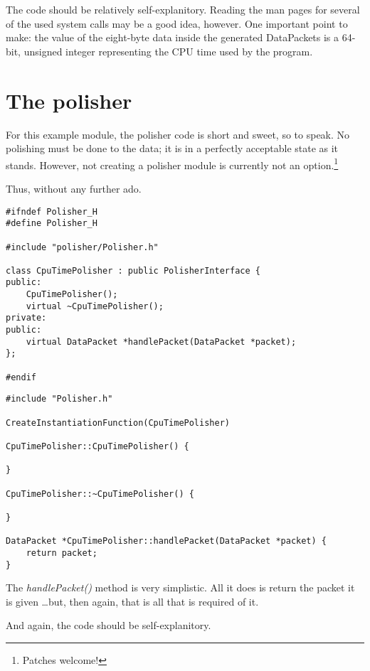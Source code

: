 The code should be relatively self-explanitory. Reading the man pages for several of the used system calls may be a
good idea, however. One important point to make: the value of the eight-byte data inside the generated DataPackets is a
64-bit, unsigned integer representing the CPU time used by the program.

\section{The polisher}

For this example module, the polisher code is short and sweet, so to speak. No polishing must be done to the data; it
is in a perfectly acceptable state as it stands. However, not creating a polisher module is currently not an
option.\footnote{Patches welcome!}

Thus, without any further ado.

\begin{lstlisting}
#ifndef Polisher_H
#define Polisher_H

#include "polisher/Polisher.h"

class CpuTimePolisher : public PolisherInterface {
public:
    CpuTimePolisher();
    virtual ~CpuTimePolisher();
private:
public:
    virtual DataPacket *handlePacket(DataPacket *packet);
};

#endif
\end{lstlisting}

\begin{lstlisting}
#include "Polisher.h"

CreateInstantiationFunction(CpuTimePolisher)

CpuTimePolisher::CpuTimePolisher() {

}

CpuTimePolisher::~CpuTimePolisher() {

}

DataPacket *CpuTimePolisher::handlePacket(DataPacket *packet) {
	return packet;
}
\end{lstlisting}

The \emph{handlePacket()} method is very simplistic. All it does is return the packet it is given \ldots but, then
again, that is all that is required of it.

And again, the code should be self-explanitory.

